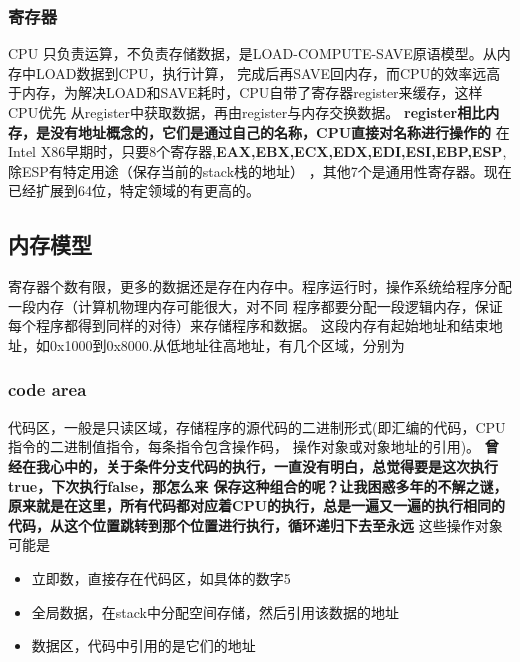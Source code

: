 \subsubsection{寄存器}
CPU 只负责运算，不负责存储数据，是LOAD-COMPUTE-SAVE原语模型。从内存中LOAD数据到CPU，执行计算，
完成后再SAVE回内存，而CPU的效率远高于内存，为解决LOAD和SAVE耗时，CPU自带了寄存器register来缓存，这样CPU优先
从register中获取数据，再由register与内存交换数据。
\newline
\textbf{register相比内存，是没有地址概念的，它们是通过自己的名称，CPU直接对名称进行操作的}
\newline
在Intel X86早期时，只要8个寄存器,\textbf{EAX,EBX,ECX,EDX,EDI,ESI,EBP,ESP},除ESP有特定用途（保存当前的stack栈的地址）
，其他7个是通用性寄存器。现在已经扩展到64位，特定领域的有更高的。 

\subsection{内存模型}
寄存器个数有限，更多的数据还是存在内存中。程序运行时，操作系统给程序分配一段内存（计算机物理内存可能很大，对不同
程序都要分配一段逻辑内存，保证每个程序都得到同样的对待）来存储程序和数据。
\newline
这段内存有起始地址和结束地址，如0x1000到0x8000.从低地址往高地址，有几个区域，分别为
\subsubsection{code area}
代码区，一般是只读区域，存储程序的源代码的二进制形式(即汇编的代码，CPU指令的二进制值指令，每条指令包含操作码，
操作对象或对象地址的引用)。
\newline
\textbf{曾经在我心中的，关于条件分支代码的执行，一直没有明白，总觉得要是这次执行true，下次执行false，那怎么来
保存这种组合的呢？让我困惑多年的不解之谜，原来就是在这里，所有代码都对应着CPU的执行，总是一遍又一遍的执行相同的
代码，从这个位置跳转到那个位置进行执行，循环递归下去至永远}
\newline
这些操作对象可能是
\begin{itemize}
    \item {立即数，直接存在代码区，如具体的数字5}
    \item {全局数据，在stack中分配空间存储，然后引用该数据的地址}
    \item {数据区，代码中引用的是它们的地址}
\end{itemize}

